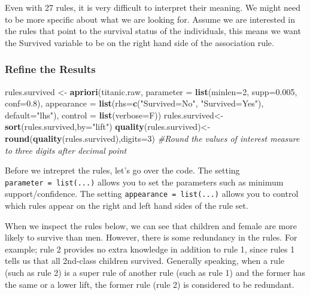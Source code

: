 \documentclass[]{article}
\newenvironment{Shaded}{\begin{snugshade}}{\end{snugshade}}
\newcommand{\CommentTok}[1]{\textcolor[rgb]{0.56,0.35,0.01}{\textit{#1}}}
\newcommand{\DataTypeTok}[1]{\textcolor[rgb]{0.13,0.29,0.53}{#1}}
\newcommand{\DecValTok}[1]{\textcolor[rgb]{0.00,0.00,0.81}{#1}}
\newcommand{\FloatTok}[1]{\textcolor[rgb]{0.00,0.00,0.81}{#1}}
\newcommand{\KeywordTok}[1]{\textcolor[rgb]{0.13,0.29,0.53}{\textbf{#1}}}
\newcommand{\NormalTok}[1]{#1}
\newcommand{\StringTok}[1]{\textcolor[rgb]{0.31,0.60,0.02}{#1}}
\begin{document}
Even with 27 rules, it is very difficult to interpret their meaning. We
might need to be more specific about what we are looking for. Assume we
are interested in the rules that point to the survival status of the
individuals, this means we want the Survived variable to be on the right
hand side of the association rule.

\hypertarget{refine-the-results}{%
\subsubsection{Refine the Results}\label{refine-the-results}}

\begin{Shaded}
\begin{Highlighting}[]
\NormalTok{rules.survived <-}\StringTok{ }\KeywordTok{apriori}\NormalTok{(titanic.raw,}
                 \DataTypeTok{parameter =} \KeywordTok{list}\NormalTok{(}\DataTypeTok{minlen=}\DecValTok{2}\NormalTok{, }\DataTypeTok{supp=}\FloatTok{0.005}\NormalTok{, }\DataTypeTok{conf=}\FloatTok{0.8}\NormalTok{),}
                 \DataTypeTok{appearance =} \KeywordTok{list}\NormalTok{(}\DataTypeTok{rhs=}\KeywordTok{c}\NormalTok{(}\StringTok{"Survived=No"}\NormalTok{, }\StringTok{"Survived=Yes"}\NormalTok{),}
                                   \DataTypeTok{default=}\StringTok{"lhs"}\NormalTok{),}
                 \DataTypeTok{control =} \KeywordTok{list}\NormalTok{(}\DataTypeTok{verbose=}\NormalTok{F))}
\NormalTok{rules.survived<-}\KeywordTok{sort}\NormalTok{(rules.survived,}\DataTypeTok{by=}\StringTok{"lift"}\NormalTok{)}
\KeywordTok{quality}\NormalTok{(rules.survived)<-}\KeywordTok{round}\NormalTok{(}\KeywordTok{quality}\NormalTok{(rules.survived),}\DataTypeTok{digits=}\DecValTok{3}\NormalTok{) }\CommentTok{#Round the values of interest measure to three digits after decimal point}
\end{Highlighting}
\end{Shaded}

Before we intrepret the rules, let's go over the code. The setting
\texttt{parameter\ =\ list(...)} allows you to set the parameters such
as minimum support/confidence. The setting
\texttt{appearance\ =\ list(...)} allows you to control which rules
appear on the right and left hand sides of the rule set.

When we inspect the rules below, we can see that children and female are
more likely to survive than men. However, there is some redundancy in
the rules. For example; rule 2 provides no extra knowledge in addition
to rule 1, since rules 1 tells us that all 2nd-class children survived.
Generally speaking, when a rule (such as rule 2) is a super rule of
another rule (such as rule 1) and the former has the same or a lower
lift, the former rule (rule 2) is considered to be redundant.
\end{document}

